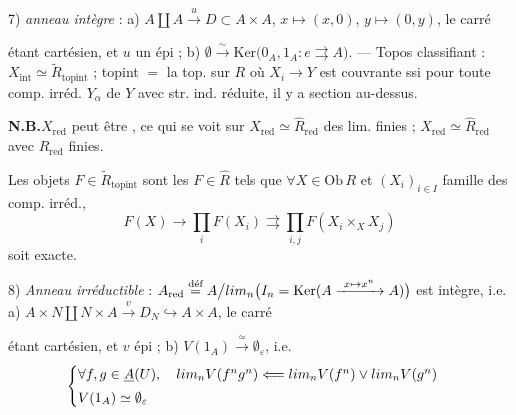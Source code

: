 \documentclass[11pt,a4paper]{article}
\begin{document}
7) \emph{anneau intègre} : a) $A \amalg A \xrightarrow{\ u\ } D \subset
A \times A$, $x \mapsto (x, 0)$, $y \mapsto (0, y)$, le carré


étant cartésien, et $u$ un épi ; b) $\emptyset \xrightarrow{\ \sim\ }
\mathrm{Ker}\bigl(0_{A}, 1_{A} : e \rightrightarrows A\bigr)$. — Topos
classifiant : $X_{\mathrm{int}} \simeq \tilde{R}_{\mathrm{topint}}$ ; topint
$=$ la top. sur $R$ où $X_{i} \to Y$ est couvrante ssi pour toute comp. irréd.
$Y_{\alpha}$ de $Y$ avec str. ind. réduite, il y a section au-dessus.


\textbf{N.B.}\quad $X_{\mathrm{red}}$ peut être \ill{}, ce qui se voit sur
$X_{\mathrm{red}} \simeq \hat{R}_{\mathrm{red}}$ \ill{} des lim. finies ;
$X_{\mathrm{red}} \simeq \hat{R}_{\mathrm{red}}$ avec $R_{\mathrm{red}}$
\ill{} finies.

Les objets $F \in \tilde{R}_{\mathrm{topint}}$ sont les $F \in \hat{R}$ tels
que $\forall X \in \mathrm{Ob}\,R$ et $(X_{i})_{i \in I}$ famille des comp.
irréd.,
\[
  F(X) \longrightarrow \prod_{i} F(X_{i}) \rightrightarrows
  \prod_{i,j} F(X_{i} \times_{X} X_{j})
\]
soit exacte.

8) \emph{Anneau irréductible} : $A_{\mathrm{red}}
\overset{\text{déf}}{=} A \big/ \varinjlim_{n} \bigl(I_{n} =
\mathrm{Ker}(A \xrightarrow{\ x \mapsto x^{n}\ } A)\bigr)$  est intègre, i.e. a) $A \times N \amalg N \times A \xrightarrow{\ v\ }
D_{N} \hookrightarrow A \times A$, le carré


étant cartésien, et $v$ épi ; b) $V(1_{A}) \xrightarrow{\ \simeq\ }
\emptyset_{\varepsilon}$, i.e. \struck{\ill{}}
\[
  \begin{cases}
    \forall f, g \in \struck{A}(U), \quad
    \varinjlim_{n} V(f^{n}g^{n}) \Longleftarrow
    \varinjlim_{n} V(f^{n}) \vee \varinjlim_{n} V(g^{n}) \\
    V(1_{A}) \simeq \emptyset_{\varepsilon}
  \end{cases}
\]
\end{document}
